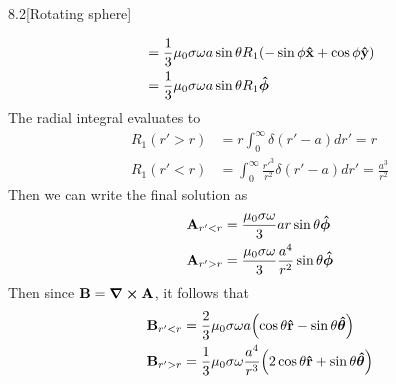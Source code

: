 \documentclass[12pt]{article}
\begin{document}
\begin{problem}{8.2}[Rotating sphere]
\begin{solution}
\begin{align}
    &=\frac13\mu_0\sigma\omega a\sin\theta
    R_1(-\sin\phi\vb{\hat{x}}+\cos\phi\vb{\hat{y}})\notag\\
    &=\frac13\mu_0\sigma\omega a\sin\theta R_1\bm{\hat{\phi}}
\end{align}
The radial integral evaluates to
\begin{subequations}
    \begin{align}
        R_1(r'>r)&=r\int_0^\infty\delta(r'-a)dr'=r\\
        R_1(r'<r)&=\int_0^\infty\frac{r'^3}{r^2}\delta(r'-a)dr'
        =\frac{a^3}{r^2}
    \end{align} 
\end{subequations}
Then we can write the final solution as
\begin{subequations}
    \begin{align}
        \vb{A}_{r'<r}&=\frac{\mu_0\sigma\omega}{3} ar\sin\theta\bm{\hat{\phi}}\\
        \vb{A}_{r'>r}&=\frac{\mu_0\sigma\omega}{3}\frac{a^4}{r^2}\sin\theta\bm{\hat{\phi}}
    \end{align} 
\end{subequations}
Then since $\vb{B}=\curl{\vb{A}}$, it follows that
\begin{subequations}
    \begin{align}
        \vb{B}_{r'<r}&=\frac23\mu_0\sigma\omega
        a\qty(\cos\theta\vb{\hat{r}}-\sin\theta\bm{\hat{\theta}})\\
        \vb{B}_{r'>r}&=\frac13\mu_0\sigma\omega\frac{a^4}{r^3}\qty(2\cos\theta\vb{\hat{r}}+\sin\theta\bm{\hat{\theta}})
    \end{align} 
\end{subequations}
\end{solution}
\end{problem}
\end{document}
